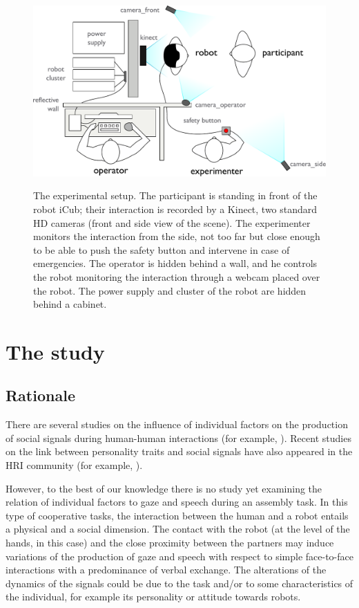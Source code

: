 \documentclass[twocolumn]{svjour3}          %
\begin{document}
\begin{figure}[ht]
\centering
{
\includegraphics[width=0.7\hsize]{figures/expe-setting.pdf}
}
\caption{The experimental setup. The participant is standing in front of the robot iCub; their interaction is recorded by a Kinect, two standard HD cameras (front and side view of the scene). The experimenter monitors the interaction from the side, not too far but close enough to be able to push the safety button and intervene in case of emergencies. The operator is hidden behind a wall, and he controls the robot monitoring the interaction through a webcam placed over the robot. The power supply and cluster of the robot are hidden behind a cabinet.}
\label{fig:setup}
\end{figure}

\section{The study}

\subsection{Rationale}

There are several studies on the influence of individual factors on the production of social signals during human-human interactions (for example, \cite{Lepri2010,Vinciarelli14}). 
Recent studies on the link between personality traits and social signals have also appeared in the HRI community (for example, \cite{Tapus08,Aly2013personality}). 

However, to the best of our knowledge there is no study yet examining the relation of individual factors to gaze and speech during an assembly task. 
In this type of cooperative tasks, the interaction between the human and a robot entails a physical and a social dimension. The contact with the robot (at the level of the hands, in this case) and the close proximity between the partners may induce variations of the production of gaze and speech with respect to simple face-to-face interactions with a predominance of verbal exchange. The alterations of the dynamics of the signals could be due to the task and/or to some characteristics of the individual, for example its personality or attitude towards robots.
\end{document}
